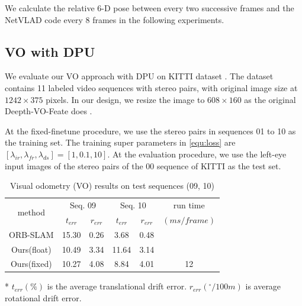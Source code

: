We calculate the relative 6-D pose between every two successive frames and the NetVLAD code every $8$ frames in the following experiments.

\subsection{VO with DPU}

We evaluate our VO approach with DPU on KITTI dataset \cite{geiger2013vision}. The dataset contains 11 labeled video sequences with stereo pairs, with original image size at $1242 \times 375$ pixels. In our design, we resize the image to $608 \times 160$ as the original Deepth-VO-Feate does \cite{Zhan:2018e92}.

At the fixed-finetune procedure, we use the stereo pairs in sequences 01 to 10 as the training set. The training super parameters in \cref{equ:loss} are $[\lambda_{ir},\lambda_{fr},\lambda_{ds}] = [1,0.1,10]$. At the evaluation procedure, we use the left-eye input images of the stereo pairs of the 00 sequence of KITTI as the test set.

\begin{table}[ht]
    \centering
    \caption{Visual odometry (VO) results on test sequences (09, 10)}
    \footnotesize
    \begin{threeparttable}
\begin{tabular}{|c||cc|cc|c|}
  \hline
  \multirow{2}[2]{*}{method} & \multicolumn{2}{c|}{Seq. 09} & \multicolumn{2}{c|}{Seq. 10} & run time  \bigstrut[t]\\
                             & $t_{err}$        & $r_{err}$ & $t_{err}$        & $r_{err}$ & $(ms/frame)$ \bigstrut[b]\\
  \hline
  ORB-SLAM  &15.30 &0.26 &3.68 &0.48 &  \bigstrut\\
  \hline
  Ours(float)  &10.49 &3.34 &11.64 &3.14 &  \bigstrut\\
  \hline
  Ours(fixed)  &10.27 &4.08 &8.84 &4.01 & 12 \bigstrut\\
  \hline
  \end{tabular}
  
  \begin{tablenotes}
        \item[*] $t_{err}(\%)$ is the average translational drift error. $r_{err}({}^{\circ}/100m)$ is average rotational drift error.
        \end{tablenotes}
      \end{threeparttable}
    \label{tab:VO}%
  \end{table}%

